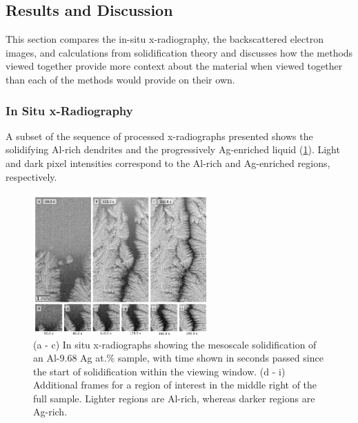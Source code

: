 \subsection{Results and Discussion}
This section compares the in-situ x-radiography, the backscattered
electron images, and calculations from solidification theory and discusses
how the methods viewed together provide more context about the material
when viewed together than each of the methods would provide on their own.

\subsubsection{In Situ x-Radiography}
A subset of the sequence of processed x-radiographs presented shows the
solidifying Al-rich dendrites and the progressively Ag-enriched liquid
(\ref{fig/03/rad-seq}). Light and dark pixel intensities correspond
to the Al-rich and Ag-enriched regions, respectively.

\begin{figure}[ht]
    \centering
    \includegraphics[width=0.6\textwidth]{figures/03/01-rad-seq.png}
    \caption{
        \small{}
        (a - c) In situ x-radiographs showing the mesoscale solidification of
        an Al-9.68 Ag at.\% sample, with time shown in seconds passed since the
        start of solidification within the viewing window.
        (d - i) Additional frames for a region of interest in the middle
        right of the full sample. Lighter regions are Al-rich, whereas darker
        regions are Ag-rich.
    }
    \label{fig/03/rad-seq}
\end{figure}


